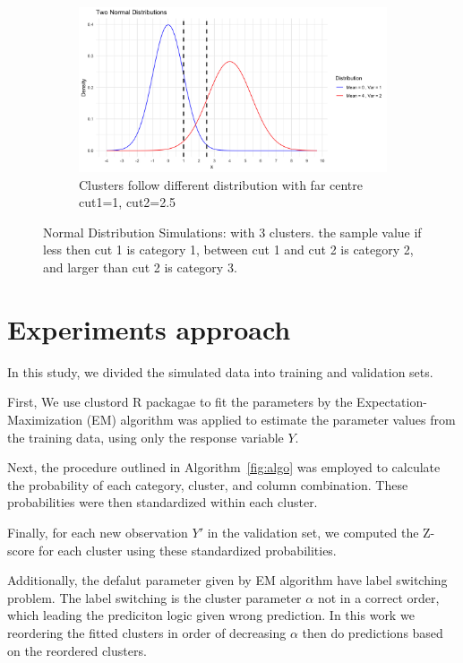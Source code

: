 \documentclass{article}
\begin{document}
\begin{figure}[htbp!]
\begin{subfigure}{0.32\textwidth}
      \centering
      \includegraphics[width=\textwidth]{images/dist_simu/nor_far.png} %
      \caption{Clusters follow different distribution with far centre\\ cut1=1, cut2=2.5}
  \end{subfigure}
  
  \caption{Normal Distribution Simulations: with 3 clusters. the sample value if less then cut 1 is category 1, between cut 1 and cut 2 is category 2, and larger than cut 2 is category 3.}
  \label{fig:dist_sim}
\end{figure}


\section{Experiments approach}

In this study, we divided the simulated data into training and validation sets.

First, We use clustord R packagae \cite{clustord2024} to fit the parameters by the Expectation-Maximization (EM) algorithm was applied to estimate the parameter values from the training data, using only the response variable $Y$.

Next, the procedure outlined in Algorithm~\ref{fig:algo} was employed to calculate the probability of each category, cluster, and column combination. 
These probabilities were then standardized within each cluster.

Finally, for each new observation $Y'$ in the validation set, we computed the Z-score for each cluster using these standardized probabilities.

Additionally, the defalut parameter given by EM algorithm have label switching problem.
The label switching is the cluster parameter $\alpha$ not in a correct order, which leading the prediciton logic given wrong prediction.
In this work we reordering the fitted clusters in order of decreasing $\alpha$ then do predictions based on the reordered clusters.
\end{document}
